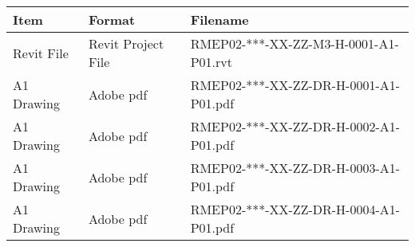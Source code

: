 \begin{tabular}{|l|l|l|}
	\hline
	\textbf{Item} & \textbf{Format} & \textbf{Filename} \\
	\hline
	Revit File  & Revit Project File & RMEP02-***-XX-ZZ-M3-H-0001-A1-P01.rvt  \\
	A1 Drawing  & Adobe pdf & RMEP02-***-XX-ZZ-DR-H-0001-A1-P01.pdf  \\
	A1 Drawing  & Adobe pdf & RMEP02-***-XX-ZZ-DR-H-0002-A1-P01.pdf  \\
	A1 Drawing  & Adobe pdf & RMEP02-***-XX-ZZ-DR-H-0003-A1-P01.pdf  \\
	A1 Drawing  & Adobe pdf & RMEP02-***-XX-ZZ-DR-H-0004-A1-P01.pdf  \\
	\hline
\end{tabular}



